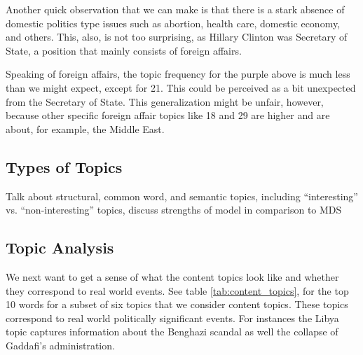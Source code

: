 \documentclass[12pt]{article}
\theoremstyle{definition}
\theoremstyle{algodesc}
\begin{document}
Another quick observation that we can make is that there is a stark absence of domestic politics type issues such as abortion, health care, domestic economy, and others.  This, also, is not too surprising, as Hillary Clinton was Secretary of State, a position that mainly consists of foreign affairs.

Speaking of foreign affairs, the topic frequency for the purple above is much less than we might expect, except for 21.  This could be perceived as a bit unexpected from the Secretary of State.  This generalization might be unfair, however, because other specific foreign affair topics like 18 and 29 are higher and are about, for example, the Middle East.


\subsection{Types of Topics}
Talk about structural, common word, and semantic topics, including ``interesting'' vs. ``non-interesting'' topics, discuss strengths of model in comparison to MDS

\subsection{Topic Analysis}

We next want to get a sense of what the content topics look like and whether they correspond to real world events.  See table \ref{tab:content_topics}, for the top 10 words for a subset of six topics that we consider content topics.  These topics correspond to real world politically significant events.  For instances the Libya topic captures information about the Benghazi scandal as well the collapse of Gaddafi's administration.  

\begin{table}[h]
\centering
{}
\caption{Some interesting content topics}
\label{tab:content_topics}
\end{table}
\end{document}
